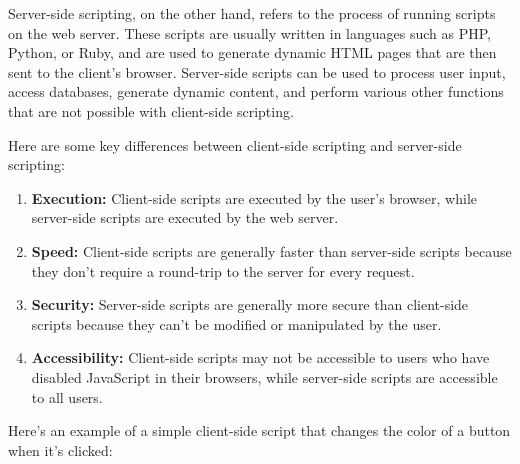 \documentclass[11pt]{article}
\begin{document}
Server-side scripting, on the other hand, refers to the process of running scripts on the web server. These scripts are usually written in languages such as PHP, Python, or Ruby, and are used to generate dynamic HTML pages that are then sent to the client's browser. Server-side scripts can be used to process user input, access databases, generate dynamic content, and perform various other functions that are not possible with client-side scripting.

Here are some key differences between client-side scripting and server-side scripting:

\begin{enumerate}
    \item \textbf{Execution:} Client-side scripts are executed by the user's browser, while server-side scripts are executed by the web server.
    \item \textbf{Speed:} Client-side scripts are generally faster than server-side scripts because they don't require a round-trip to the server for every request.
    \item \textbf{Security:} Server-side scripts are generally more secure than client-side scripts because they can't be modified or manipulated by the user.
    \item \textbf{Accessibility:} Client-side scripts may not be accessible to users who have disabled JavaScript in their browsers, while server-side scripts are accessible to all users.
\end{enumerate}


Here's an example of a simple client-side script that changes the color of a button when it's clicked:
\end{document}
